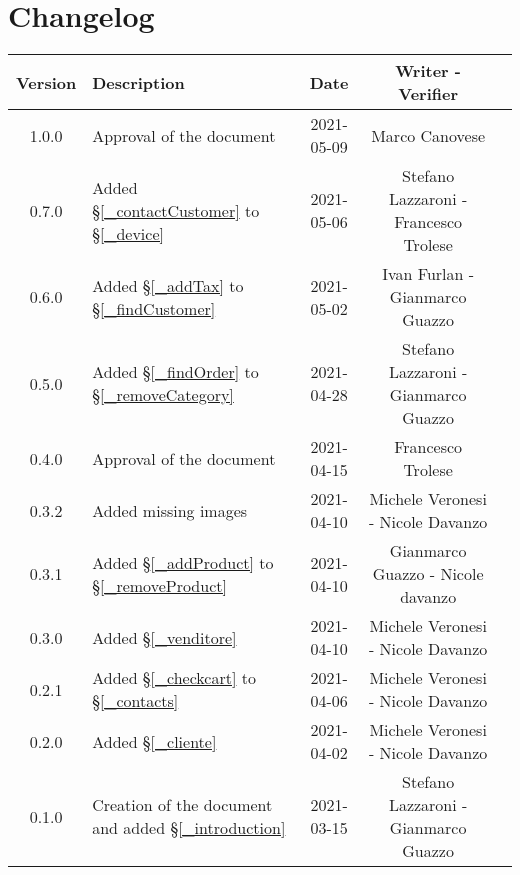 \section*{Changelog}

\begin{center}
	\begin{longtable}{|c|p{5cm}|c|c|c|}
	\hline
	\rowcolor{lighter-grayer}
	\textbf{Version} & \textbf{Description} & \textbf{Date} & \textbf{Writer - Verifier} \\
	\hline
	\endfirsthead


	\hline
	1.0.0 & Approval of the document & 2021-05-09 & Marco Canovese\\
	0.7.0 & Added \S\ref{_contactCustomer} to \S\ref{_device} & 2021-05-06 & Stefano Lazzaroni - Francesco Trolese \\
	0.6.0 & Added \S\ref{_addTax} to \S\ref{_findCustomer} & 2021-05-02 & Ivan Furlan - Gianmarco Guazzo \\
	0.5.0 & Added \S\ref{_findOrder} to \S\ref{_removeCategory}  & 2021-04-28 & Stefano Lazzaroni - Gianmarco Guazzo \\
	0.4.0 & Approval of the document & 2021-04-15 & Francesco Trolese\\
	0.3.2 & Added missing images & 2021-04-10 & Michele Veronesi - Nicole Davanzo\\
	0.3.1 & Added \S\ref{_addProduct} to \S\ref{_removeProduct}  & 2021-04-10 & Gianmarco Guazzo - Nicole davanzo\\
	0.3.0 & Added \S\ref{_venditore} & 2021-04-10 & Michele Veronesi - Nicole Davanzo\\
	0.2.1 & Added \S\ref{_checkcart} to \S\ref{_contacts} & 2021-04-06 & Michele Veronesi - Nicole Davanzo\\
	0.2.0 & Added \S\ref{_cliente} & 2021-04-02 & Michele Veronesi - Nicole Davanzo\\
	0.1.0 & Creation of the document and added \S\ref{_introduction}  & 2021-03-15 & Stefano Lazzaroni - Gianmarco Guazzo\\
	\hline

	\end{longtable}
\end{center}